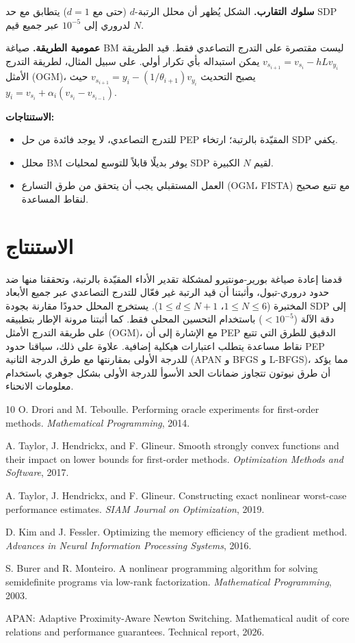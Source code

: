 \documentclass[12pt,a4paper]{article}
\theoremstyle{arabicremark}
\begin{document}
\textbf{سلوك التقارب.} الشكل يُظهر أن محلل الرتبة-$d$ (حتى مع $d=1$) يتطابق مع حد SDP لدروري إلى $10^{-5}$ عبر جميع قيم $N$.

\textbf{عمومية الطريقة.} صياغة BM ليست مقتصرة على التدرج التصاعدي فقط. قيد الطريقة $v_{s_{i+1}} = v_{s_i} - h L v_{y_i}$ يمكن استبداله بأي تكرار أولي. على سبيل المثال، لطريقة التدرج الأمثل (OGM)، يصبح التحديث $v_{s_{i+1}} = y_i - (1/\theta_{i+1}) v_{y_i}$ حيث $y_i = v_{s_i} + \alpha_i (v_{s_i} - v_{s_{i-1}})$.

\textbf{الاستنتاجات:}
\begin{itemize}
\item للتدرج التصاعدي، لا يوجد فائدة من حل PEP المقيّدة بالرتبة؛ ارتخاء SDP يكفي.
\item محلل BM يوفر بديلًا قابلاً للتوسع لمحليات SDP لقيم $N$ الكبيرة.
\item العمل المستقبلي يجب أن يتحقق من طرق التسارع (OGM، FISTA) مع تتبع صحيح لنقاط المساعدة.
\end{itemize}

\section{الاستنتاج}

قدمنا إعادة صياغة بورير-مونتيرو لمشكلة تقدير الأداء المقيّدة بالرتبة، وتحققنا منها ضد حدود دروري-تبول، وأثبتنا أن قيد الرتبة غير فعّال للتدرج التصاعدي عبر جميع الأبعاد المختبرة ($1 \leq N \leq 6$، $1 \leq d \leq N+1$). يستخرج المحلل حدودًا مقارنة بجودة SDP إلى دقة الآلة ($< 10^{-5}$) باستخدام التحسين المحلي فقط. كما أثبتنا مرونة الإطار بتطبيقه على طريقة التدرج الأمثل (OGM)، مع الإشارة إلى أن PEP الدقيق للطرق التي تتبع نقاط مساعدة يتطلب اعتبارات هيكلية إضافية. علاوة على ذلك، سياقنا حدود PEP للدرجة الأولى بمقارنتها مع طرق الدرجة الثانية (APAN و BFGS و L-BFGS)، مما يؤكد أن طرق نيوتون تتجاوز ضمانات الحد الأسوأ للدرجة الأولى بشكل جوهري باستخدام معلومات الانحناء.

\begin{thebibliography}{10}
O. Drori and M. Teboulle.
Performing oracle experiments for first-order methods.
\textit{Mathematical Programming}, 2014.

A. Taylor, J. Hendrickx, and F. Glineur.
Smooth strongly convex functions and their impact on lower bounds for first-order methods.
\textit{Optimization Methods and Software}, 2017.

A. Taylor, J. Hendrickx, and F. Glineur.
Constructing exact nonlinear worst-case performance estimates.
\textit{SIAM Journal on Optimization}, 2019.

D. Kim and J. Fessler.
Optimizing the memory efficiency of the gradient method.
\textit{Advances in Neural Information Processing Systems}, 2016.

S. Burer and R. Monteiro.
A nonlinear programming algorithm for solving semidefinite programs via low-rank factorization.
\textit{Mathematical Programming}, 2003.

APAN: Adaptive Proximity-Aware Newton Switching.
Mathematical audit of core relations and performance guarantees.
Technical report, 2026.
\end{thebibliography}
\end{document}
